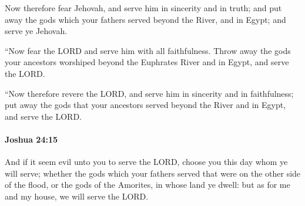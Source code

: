 			\begin{versebox}
					\item[BHS] 
					\item[ASV] Now therefore fear Jehovah, and serve him in sincerity and in truth; and put away the gods which your fathers served beyond the River, and in Egypt; and serve ye Jehovah.
					\item[NIV] “Now fear the LORD and serve him with all faithfulness. Throw away the gods your ancestors worshiped beyond the Euphrates River and in Egypt, and serve the LORD.
					\item[NRSV] “Now therefore revere the LORD, and serve him in sincerity and in faithfulness; put away the gods that your ancestors served beyond the River and in Egypt, and serve the LORD.
			\end{versebox}

		\paragraph{Joshua 24:15} %
			\label{JOSHUA-24-15}

			And if it seem evil unto you to serve the LORD, choose you this day whom ye will serve; whether the gods which your fathers served that were on the other side of the flood, or the gods of the Amorites, in whose land ye dwell: but as for me and my house, we will serve the LORD.

